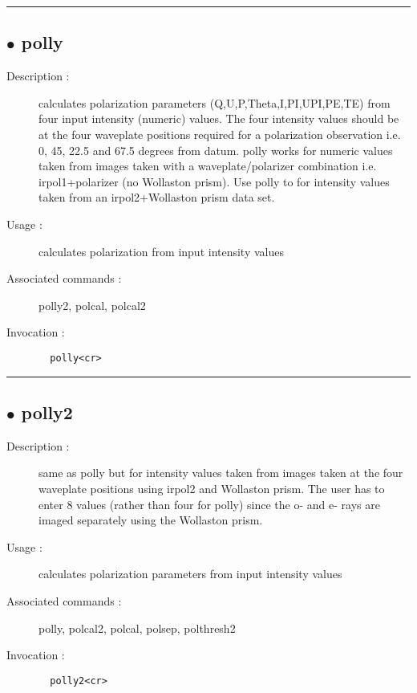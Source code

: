 \hrule \subsection*{$\bullet$ polly}
\begin{description}
\item[Description :] calculates polarization parameters (Q,U,P,Theta,I,PI,UPI,PE,TE)
from four input intensity (numeric) values.  The four intensity values
should be at the four waveplate positions required for a polarization
observation i.e. 0, 45, 22.5 and 67.5 degrees from datum.  polly works
for numeric values taken from images taken with a waveplate/polarizer
combination i.e. irpol1+polarizer (no Wollaston prism).  Use polly to for
intensity values taken from an irpol2+Wollaston prism data set.
\item[Usage :] calculates polarization from input intensity values
\item[Associated commands :] polly2, polcal, polcal2
\item[Invocation :]

\verb+  polly<cr> +\end{description}

\hrule \subsection*{$\bullet$ polly2}
\begin{description}
\item[Description :] same as polly but for intensity values taken from images taken
at the four waveplate positions using irpol2 and Wollaston prism.  The
user has to enter 8 values (rather than four for polly) since the o- and
e- rays are imaged separately using the Wollaston prism.
\item[Usage :] calculates polarization parameters from input intensity values
\item[Associated commands :] polly, polcal2, polcal, polsep, polthresh2
\item[Invocation :]

\verb+  polly2<cr> +\end{description}

